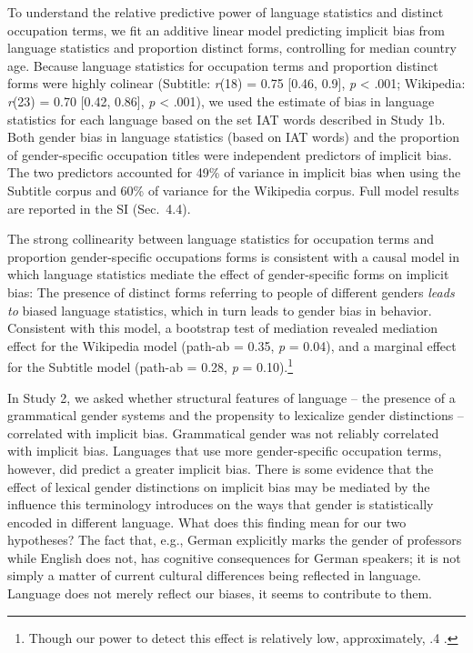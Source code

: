 \documentclass[9pt,twocolumn,twoside,lineno]{pnas-new}
\begin{document}
To understand the relative predictive power of language statistics and
distinct occupation terms, we fit an additive linear model predicting implicit bias
from language statistics and proportion distinct forms, controlling for
median country age. Because language statistics for occupation terms and
proportion distinct forms were highly colinear (Subtitle: \emph{r}(18)  = 0.75 {[}0.46, 0.9{]}, \emph{p}
\textless{} .001; Wikipedia: \emph{r}(23) =
0.70  {[}0.42, 0.86{]}, \emph{p} \textless{} .001), we used the estimate of bias in language statistics
for each language based on the set IAT words described in Study 1b. Both
gender bias in language statistics (based on IAT words) and the
proportion of gender-specific occupation titles were independent
predictors of implicit bias. The two predictors accounted for 49\% of
variance in implicit bias when using the Subtitle corpus and 60\% of
variance for the Wikipedia corpus. Full model results are reported in
the SI (Sec.\ 4.4).

The strong collinearity between language statistics for
occupation terms and proportion gender-specific occupations forms is
consistent with a causal model in which language statistics mediate the
effect of gender-specific forms on implicit bias: The presence of
distinct forms referring to people of different genders \emph{leads to}
biased language statistics, which in turn leads to gender bias in
behavior. Consistent with this model, a bootstrap test of mediation
revealed mediation effect for the
Wikipedia model (path-ab = 0.35, \emph{p} =
0.04), and a marginal effect for the Subtitle model (path-ab = 0.28,
\emph{p} = 0.10).\footnote{Though our power to detect this effect is relatively low, approximately, .4 \citep[ref.\,][]{schoemann2017determining}.}

In Study 2, we asked whether structural features of language -- the
presence of a grammatical gender systems and the propensity to
lexicalize gender distinctions -- correlated with implicit bias.
Grammatical gender was not reliably correlated with implicit bias.
Languages that use more gender-specific occupation terms, however, did
predict a greater implicit bias. There is some evidence that the effect
of lexical gender distinctions on implicit bias may be mediated by the
influence this terminology introduces on the ways that gender is
statistically encoded in different language. What does this finding mean
for our two hypotheses? The fact that, e.g., German explicitly marks the
gender of professors while English does not, has cognitive consequences
for German speakers; it is not simply a matter of current cultural
differences being reflected in language. Language does not merely
reflect our biases, it seems to contribute to them.
\end{document}
